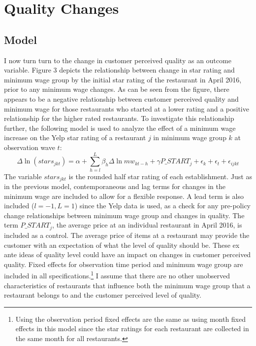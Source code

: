 \documentclass[11pt]{article}
\begin{document}
\section{Quality Changes}

\subsection{Model}
I now turn turn to the change in customer perceived quality as an outcome variable. Figure 3 depicts the relationship between change in star rating and minimum wage group by the initial star rating of the restaurant in April 2016, prior to any minimum wage changes. As can be seen from the figure, there appears to be a negative relationship between customer perceived quality and minimum wage for those restaurants who started at a lower rating and a positive relationship for the higher rated restaurants. To investigate this relationship further, the following model is used to analyze the effect of a minimum wage increase on the Yelp star rating of a restaurant $j$ in minimum wage group $k$ at observation wave $t$:
\begin{dmath}
\Delta \ln(stars_{jkt}) = \alpha + \sum_{h=l}^{L}\beta_h \Delta \ln mw_{kt-h}  + \gamma  P\_START_{j} + \epsilon_k + \epsilon_t + \epsilon_{ijkt}
\end{dmath}
The variable $stars_{jkt}$ is the rounded half star rating of each establishment. Just as in the previous model, contemporaneous and lag terms for changes in the minimum wage are included to allow for a flexible response. A lead term is also included ($l=-1,L=1$) since the Yelp data is used, as a check for any pre-policy change relationships between minimum wage group and changes in quality. The term $P\_START_j$, the average price at an individual restaurant in April 2016, is included as a control. The average price of items at a restaurant may provide the customer with an expectation of what the level of quality should be. These ex ante ideas of quality level could have an impact on changes in customer perceived quality. Fixed effects for observation time period and minimum wage group are included in all specifications.\footnote{Using the observation period fixed effects are the same as using month fixed effects in this model since the star ratings for each restaurant are collected in the same month for all restaurants.} I assume that there are no other unobserved characteristics of restaurants that influence both the minimum wage group that a restaurant belongs to and the customer perceived level of quality. 
\end{document}
